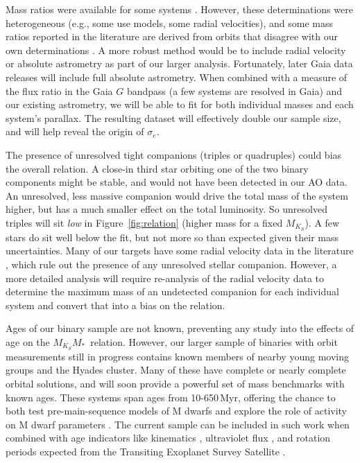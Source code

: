 \documentclass[twocolumn]{aastex62}
\newcommand{\mks}{$M_{K_S}$}
\newcommand{\mmk}{$M_{K_S}$\textendash$M_*$}
\begin{document}
Mass ratios were available for some systems  \citep[e.g.,][]{Soderhjelm1999,Mlg2007b,Dupuy2017}. However, these determinations were heterogeneous (e.g., some use models, some radial velocities), and some mass ratios reported in the literature are derived from orbits that disagree with our own determinations \citep[e.g.,][]{Koh2012}. A more robust method would be to include radial velocity or absolute astrometry as part of our larger analysis. Fortunately, later Gaia data releases will include full absolute astrometry. When combined with a measure of the flux ratio in the Gaia $G$ bandpass (a few systems are resolved in Gaia) and our existing astrometry, we will be able to fit for both individual masses and each system's parallax. The resulting dataset will effectively double our sample size, and will help reveal the origin of $\sigma_e$. 

The presence of unresolved tight companions (triples or quadruples) could bias the overall relation. A close-in third star orbiting one of the two binary components might be stable, and would not have been detected in our AO data. An unresolved, less massive companion would drive the total mass of the system higher, but has a much smaller effect on the total luminosity. So unresolved triples will sit {\it low} in Figure~\ref{fig:relation} (higher mass for a fixed \mks). A few stars do sit well below the fit, but not more so than expected given their mass uncertainties. Many of our targets have some radial velocity data in the literature \citep[e.g.,][]{1999A&A...344..897D,Raghavan2010,Benedict2016}, which rule out the presence of any unresolved stellar companion. However, a more detailed analysis will require re-analysis of the radial velocity data to determine the maximum mass of an undetected companion for each individual system and convert that into a bias on the relation. 

Ages of our binary sample are not known, preventing any study into the effects of age on the \mmk\ relation. However, our larger sample of binaries with orbit measurements still in progress contains known members of nearby young moving groups and the Hyades cluster. Many of these have complete or nearly complete orbital solutions, and will soon provide a powerful set of mass benchmarks with known ages. These systems span ages from 10-650\,Myr, offering the chance to both test pre-main-sequence models of M dwarfs \citep{2015ApJ...813L..11M,2016ApJ...817..164R,2016ApJ...818..156C,2016AJ....152..175N} and explore the role of activity on M dwarf parameters \citep[e.g.,][]{Spada2013,2018arXiv180404133K}. The current sample can be included in such work when combined with age indicators like kinematics \citep{2018MNRAS.tmp..966W}, ultraviolet flux \citep{Ansdell2015}, and rotation periods expected from the Transiting Exoplanet Survey Satellite \citep[{\it TESS},][]{2014SPIE.9143E..20R}. 
\end{document}
